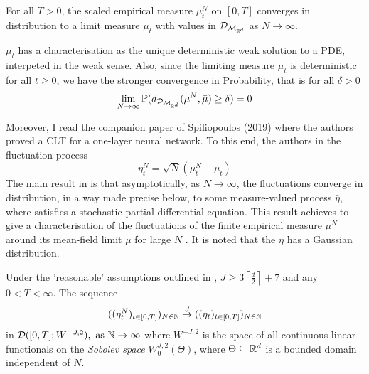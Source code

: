 \documentclass{article}
\begin{document}
\begin{theorem}\label{thm: spilopoulos lln}
	For all $ T>0$, the scaled empirical measure $ \mu^{N}_{t}$ on $ [0,T]$ converges in distribution to a
 limit measure $ \bar{\mu}_{t}$ with values in $  \mathcal{D}_{\mathcal{M}_{\mathbb{R}^{d}}} $ as $ N\to \infty$.
\end{theorem}

\begin{remark}
    $ \mu_{t}$ has a characterisation as the unique deterministic weak solution to a PDE, interpeted in the weak sense. Also, since the limiting measure $ \mu_{t}$ is deterministic for all $ t\geq 0$, we have the stronger convergence in Probability, that is for all $ \delta >0$
    \[
    \displaystyle \lim_{N\to \infty}\mathbb{P}(d_{  \mathcal{D}_{\mathcal{M}_{\mathbb{R}^{d}}} }(\mu^{N}, \bar{\mu})\geq \delta) = 0 
    \]
    
\end{remark}


Moreover, I read the companion paper of Spiliopoulos (2019) \cite{sirignano2019meanfieldanalysisclt} where the authors proved a CLT for a one-layer neural network. To this end, the authors in \cite{sirignano2019meanfieldanalysisclt} the fluctuation process 
\begin{equation}
	\eta^{N}_t = \sqrt{N}(\mu^{N}_{t}-\bar{\mu}_{t})
\end{equation}
The main result in \cite{sirignano2019meanfieldanalysisclt} is that asymptotically, as $ N\to \infty$, the fluctuations converge in distribution, in a way made precise below, to some measure-valued process $ \bar{\eta}$, where satisfies a stochastic partial differential equation. This result achieves to give a characterisation of the fluctuations of the finite empirical measure $ \mu^{N}$ around its mean-field limit $ \bar{\mu}$ for large $ N$ . It is noted that the $ \bar{\eta}$
has a Gaussian distribution.

\begin{theorem}\label{thm: spiliopoulos CLT}
	Under the 'reasonable' assumptions outlined in \cite{sirignano2019meanfieldanalysisclt}, $J \geq 3\left \lceil \frac{d}{2}\right\rceil+7$ and any $ 0<T<\infty$. The sequence
	\begin{equation} 
		((\eta^{N}_{t})_{t\in [0,T]})_{N\in \mathbb{N}}\stackrel{d}{\to} ((\bar{\eta}_{t})_{t\in [0,T]})_{N\in \mathbb{N}}
	\end{equation}
	in $\mathcal{D}([0,T];W^{-J,2}), \text{ as } \mathbb{N}\to \infty$ where $ W^{-J,2}$ is the space of all continuous linear functionals on the \textit{Sobolev space} $ W^{J,2}_{0}(\Theta)$, where $ \Theta\subseteq\mathbb{R}^{d}$ is a bounded domain independent of $ N$.
\end{theorem}
\end{document}
